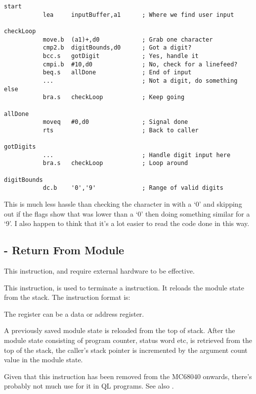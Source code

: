 \begin{lstlisting}[firstnumber=1,caption={Example of the \opcode{CMP2} Instruction}]
start
           lea     inputBuffer,a1      ; Where we find user input
           
checkLoop           
           move.b  (a1)+,d0            ; Grab one character
           cmp2.b  digitBounds,d0      ; Got a digit?
           bcc.s   gotDigit            ; Yes, handle it
           cmpi.b  #10,d0              ; No, check for a linefeed?
           beq.s   allDone             ; End of input
           ...                         ; Not a digit, do something else
           bra.s   checkLoop           ; Keep going
           
allDone
           moveq   #0,d0               ; Signal done
           rts                         ; Back to caller           
           
gotDigits
           ...                         ; Handle digit input here
           bra.s   checkLoop           ; Loop around

digitBounds
           dc.b    '0','9'             ; Range of valid digits           
\end{lstlisting}

This is much less hassle than checking the character in  with a `0' and skipping out if the flags show that  was lower than a `0' then doing something similar for a `9'. I also happen to think that it's a lot easier to read the code done in this way.

\subsection{ - Return From Module}

This instruction, and  require external hardware to be effective. 

This instruction, is used to terminate a  instruction. It reloads the module state from the stack. The instruction format is:


The register can be a data or address register.

A previously saved module state is reloaded from the top of stack. After the module state consisting of program counter, status word etc, is retrieved from the top of the stack, the caller’s stack pointer is incremented by the argument count value in the module state.

Given that this instruction has been removed from the MC68040 onwards, there's probably not much use for it in QL programs. See also .

